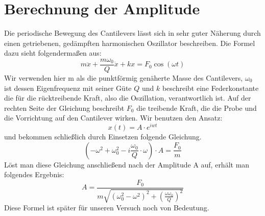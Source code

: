 \section{Berechnung der Amplitude}
\label{herleitung}
 
Die periodische Bewegung des Cantilevers lässt sich in sehr guter Näherung durch einen getriebenen, gedämpften harmonischen Oszillator beschreiben. Die Formel dazu sieht folgendermaßen aus:
\[
    m \ddot{x} + \frac{m \omega_0}{Q} \dot{x} + kx = F_0 \cos(\omega t)
\]
Wir verwenden hier m als die punktförmig genäherte Masse des Cantilevers, $\omega_0$ ist dessen Eigenfrequenz mit seiner Güte $Q$ und $k$ beschreibt eine Federkonstante die für die rücktreibende Kraft, also die Oszillation, verantwortlich ist.
Auf der rechten Seite der Gleichung beschreibt $F_0$ die treibende Kraft, die die Probe und die Vorrichtung auf den Cantilever wirken.
Wir benutzen den Ansatz:
\[
    x(t)=A \cdot e^{iwt}
\]
und bekommen schließlich durch Einsetzen folgende Gleichung.
\[
   \left(-\omega^2+\omega_0^2-i\frac{\omega_0}{Q} \cdot \omega \right) \cdot A 
   = \frac{F_0}{m}
\]
Löst man diese Gleichung anschließend nach der Amplitude A auf, erhält man 
folgendes Ergebnis:
\[
    A = \frac{F_0}{m \sqrt{ ( \omega_0^2 - \omega^2 )^2 + \left( \frac{\omega 
        \omega_0}{Q} \right)^2}}
\]
Diese Formel ist später für unseren Versuch noch von Bedeutung.
